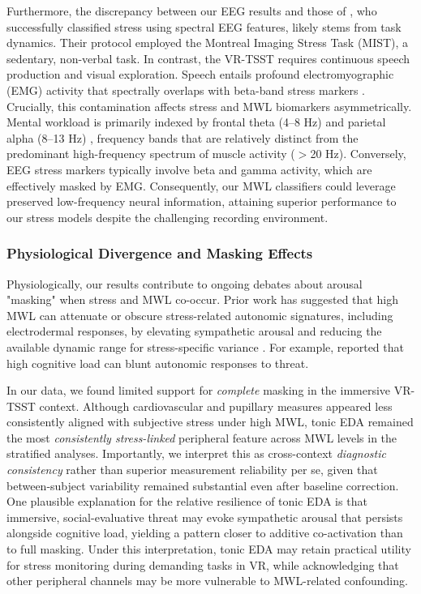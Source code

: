 \documentclass[lettersize,journal]{IEEEtran}
\begin{document}
Furthermore, the discrepancy between our EEG results and those of \cite{bagheriSimultaneousClassificationBoth2022}, who successfully classified stress using spectral EEG features, likely stems from task dynamics. Their protocol employed the Montreal Imaging Stress Task (MIST), a sedentary, non-verbal task. In contrast, the VR-TSST requires continuous speech production and visual exploration. Speech entails profound electromyographic (EMG) activity that spectrally overlaps with beta-band stress markers \cite{goncharovaEMGContaminationEEG2003}. Crucially, this contamination affects stress and MWL biomarkers asymmetrically. Mental workload is primarily indexed by frontal theta (4--8 Hz) and parietal alpha (8--13 Hz) \cite{EEGbasedWorkloadEstimation}, frequency bands that are relatively distinct from the predominant high-frequency spectrum of muscle activity ($>$20 Hz). Conversely, EEG stress markers typically involve beta and gamma activity, which are effectively masked by EMG. Consequently, our MWL classifiers could leverage preserved low-frequency neural information, attaining superior performance to our stress models despite the challenging recording environment.

\subsubsection{Physiological Divergence and Masking Effects}
Physiologically, our results contribute to ongoing debates about arousal "masking" when stress and MWL co-occur. Prior work has suggested that high MWL can attenuate or obscure stress-related autonomic signatures, including electrodermal responses, by elevating sympathetic arousal and reducing the available dynamic range for stress-specific variance \cite{conwayEffectMentalWorkload2013, setzDiscriminatingStressCognitive2010}. For example, \cite{conwayEffectStressCognitive2013} reported that high cognitive load can blunt autonomic responses to threat.

In our data, we found limited support for \emph{complete} masking in the immersive VR-TSST context. Although cardiovascular and pupillary measures appeared less consistently aligned with subjective stress under high MWL, tonic EDA remained the most \emph{consistently stress-linked} peripheral feature across MWL levels in the stratified analyses. Importantly, we interpret this as cross-context \emph{diagnostic consistency} rather than superior measurement reliability per se, given that between-subject variability remained substantial even after baseline correction. One plausible explanation for the relative resilience of tonic EDA is that immersive, social-evaluative threat may evoke sympathetic arousal that persists alongside cognitive load, yielding a pattern closer to additive co-activation than to full masking. Under this interpretation, tonic EDA may retain practical utility for stress monitoring during demanding tasks in VR, while acknowledging that other peripheral channels may be more vulnerable to MWL-related confounding.
\end{document}
